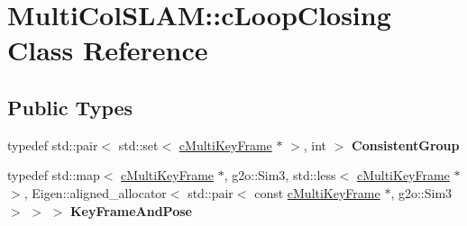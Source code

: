 \hypertarget{classMultiColSLAM_1_1cLoopClosing}{}\section{Multi\+Col\+S\+L\+AM\+:\+:c\+Loop\+Closing Class Reference}
\label{classMultiColSLAM_1_1cLoopClosing}
\subsection*{Public Types}
\begin{DoxyCompactItemize}
\item 
typedef std\+::pair$<$ std\+::set$<$ \hyperlink{classMultiColSLAM_1_1cMultiKeyFrame}{c\+Multi\+Key\+Frame} $\ast$ $>$, int $>$ {\bfseries Consistent\+Group}\hypertarget{classMultiColSLAM_1_1cLoopClosing_a2c74b62c4857235a72b61ea1bd13ab25}{}\label{classMultiColSLAM_1_1cLoopClosing_a2c74b62c4857235a72b61ea1bd13ab25}

\item 
typedef std\+::map$<$ \hyperlink{classMultiColSLAM_1_1cMultiKeyFrame}{c\+Multi\+Key\+Frame} $\ast$, g2o\+::\+Sim3, std\+::less$<$ \hyperlink{classMultiColSLAM_1_1cMultiKeyFrame}{c\+Multi\+Key\+Frame} $\ast$ $>$, Eigen\+::aligned\+\_\+allocator$<$ std\+::pair$<$ const \hyperlink{classMultiColSLAM_1_1cMultiKeyFrame}{c\+Multi\+Key\+Frame} $\ast$, g2o\+::\+Sim3 $>$ $>$ $>$ {\bfseries Key\+Frame\+And\+Pose}\hypertarget{classMultiColSLAM_1_1cLoopClosing_a503aa7572fabfe4062abfbc6ab7c0cba}{}\label{classMultiColSLAM_1_1cLoopClosing_a503aa7572fabfe4062abfbc6ab7c0cba}

\end{DoxyCompactItemize}
